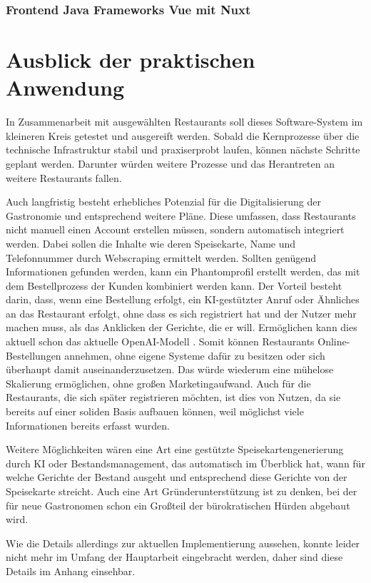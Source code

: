 \subsubsection{Frontend Java Frameworks Vue mit Nuxt}

\section{Ausblick der praktischen Anwendung}
\label{sec:zukunft}

In Zusammenarbeit mit ausgewählten Restaurants soll dieses Software-System im kleineren Kreis getestet und ausgereift werden. Sobald die Kernprozesse über die technische Infrastruktur stabil und praxiserprobt laufen, können nächste Schritte geplant werden. Darunter würden weitere Prozesse und das Herantreten an weitere Restaurants fallen. 

Auch langfristig besteht erhebliches Potenzial für die Digitalisierung der Gastronomie und entsprechend weitere Pläne. Diese umfassen, dass Restaurants nicht manuell einen Account erstellen müssen, sondern automatisch integriert werden. Dabei sollen die Inhalte wie deren Speisekarte, Name und Telefonnummer durch Webscraping ermittelt werden. Sollten genügend Informationen gefunden werden, kann ein Phantomprofil erstellt werden, das mit dem Bestellprozess der Kunden kombiniert werden kann. Der Vorteil besteht darin, dass, wenn eine Bestellung erfolgt, ein \acs{KI}-gestützter Anruf oder Ähnliches an das Restaurant erfolgt, ohne dass es sich registriert hat und der Nutzer mehr machen muss, als das Anklicken der Gerichte, die er will. Ermöglichen kann dies aktuell schon das aktuelle OpenAI-Modell \citep[vgl.][]{openai_introducing_2024}. Somit können Restaurants Online-Bestellungen annehmen, ohne eigene Systeme dafür zu besitzen oder sich überhaupt damit auseinanderzusetzen. Das würde wiederum eine mühelose Skalierung ermöglichen, ohne großen Marketingaufwand. Auch für die Restaurants, die sich später registrieren möchten, ist dies von Nutzen, da sie bereits auf einer soliden Basis aufbauen können, weil möglichst viele Informationen bereits erfasst wurden.

Weitere Möglichkeiten wären eine Art eine gestützte Speisekartengenerierung durch \acs{KI} oder Bestandsmanagement, das automatisch im Überblick hat, wann für welche Gerichte der Bestand ausgeht und entsprechend diese Gerichte von der Speisekarte streicht. Auch eine Art Gründerunterstützung ist zu denken, bei der für neue Gastronomen schon ein Großteil der bürokratischen Hürden abgebaut wird.

Wie die Details allerdings zur aktuellen Implementierung aussehen, konnte leider nicht mehr im Umfang der Hauptarbeit eingebracht werden, daher sind diese Details im Anhang einsehbar.
